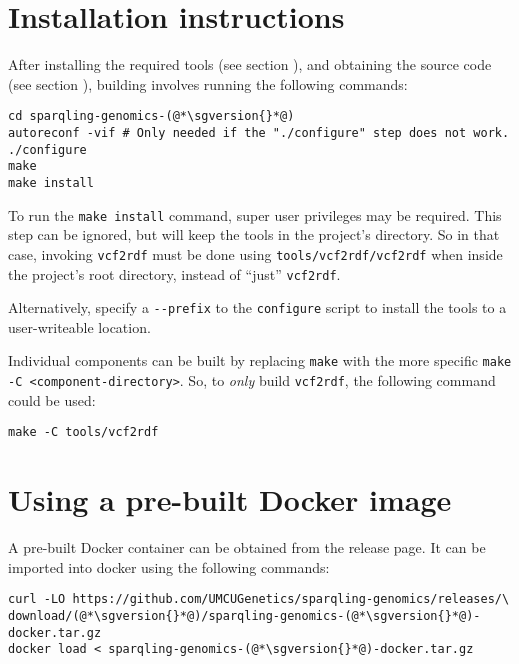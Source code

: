 \section{Installation instructions}

  After installing the required tools (see section ),
  and obtaining the source code (see section ),
  building involves running the following commands:

\begin{siderules}
\begin{lstlisting}
cd sparqling-genomics-(@*\sgversion{}*@)
autoreconf -vif # Only needed if the "./configure" step does not work.
./configure
make
make install
\end{lstlisting}
\end{siderules}

  To run the \texttt{make install} command, super user privileges may be
  required.  This step can be ignored, but will keep the tools in the project's
  directory.  So in that case, invoking \texttt{vcf2rdf} must be done using
  \texttt{tools/vcf2rdf/vcf2rdf} when inside the project's root directory,
  instead of ``just'' \texttt{vcf2rdf}.

  Alternatively, specify a \texttt{-{}-prefix} to the \texttt{configure}
  script to install the tools to a user-writeable location.

  Individual components can be built by replacing \texttt{make} with the
  more specific \texttt{make -C <component-directory>}.  So, to \emph{only}
  build \texttt{vcf2rdf}, the following command could be used:

\begin{siderules}
\begin{verbatim}
make -C tools/vcf2rdf
\end{verbatim}
\end{siderules}

\section{Using a pre-built Docker image}

  A pre-built Docker container can be obtained from the release page.  It
  can be imported into docker using the following commands:

\begin{siderules}
\begin{lstlisting}
curl -LO https://github.com/UMCUGenetics/sparqling-genomics/releases/\
download/(@*\sgversion{}*@)/sparqling-genomics-(@*\sgversion{}*@)-docker.tar.gz
docker load < sparqling-genomics-(@*\sgversion{}*@)-docker.tar.gz
\end{lstlisting}
\end{siderules}


